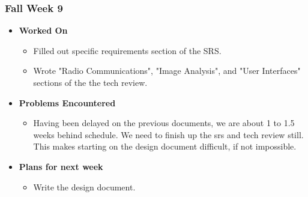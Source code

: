 \documentclass[compsoc,draftclsnofoot,onecolumn,10pt]{IEEEtran}
\begin{document}
\subsubsection{Fall Week 9}
\begin{itemize}
    \item {\textbf{Worked On}}
    \begin{itemize}
        \item Filled out specific requirements section of the SRS.
        \item Wrote "Radio Communications", "Image Analysis", and "User Interfaces" sections of the the tech review.
    \end{itemize}

    \item {\textbf{Problems Encountered}}
    \begin{itemize}
        \item Having been delayed on the previous documents, we are about 1 to 1.5 weeks behind schedule. We need to finish up the srs and tech review still. This makes starting on the design document difficult, if not impossible.
    \end{itemize}

    \item{\textbf{Plans for next week}}
    \begin{itemize}
        \item Write the design document.
    \end{itemize}

\end{itemize}
\end{document}
